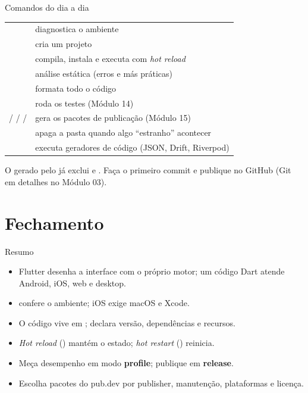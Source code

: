 \documentclass[aspectratio=169,10pt]{beamer}
\begin{document}
\begin{frame}{Comandos do dia a dia}
  \footnotesize
  \begin{tabularx}{\textwidth}{@{}l L@{}}
    \toprule
     &  \\
    \midrule
     & diagnostica o ambiente \\
     & cria um projeto \\
     & compila, instala e executa com \emph{hot reload} \\
     & análise estática (erros e más práticas) \\
     & formata todo o código \\
     & roda os testes (Módulo 14) \\
     /  /  /  & gera os pacotes de publicação (Módulo 15) \\
     & apaga a pasta  quando algo ``estranho'' acontecer \\
     & executa geradores de código (JSON, Drift, Riverpod) \\
    \bottomrule
  \end{tabularx}
  \begin{dica}[Git]
    O  gerado pelo  já exclui  e . Faça o primeiro commit e publique no GitHub (Git em detalhes no Módulo 03).
  \end{dica}
\end{frame}

\section{Fechamento}

\begin{frame}{Resumo}
  \begin{resumo}
    \begin{itemize}
      \item Flutter desenha a interface com o próprio motor; um código Dart atende Android, iOS, web e desktop.
      \item {} confere o ambiente; iOS exige macOS e Xcode.
      \item O código vive em ;  declara versão, dependências e recursos.
      \item \emph{Hot reload} () mantém o estado; \emph{hot restart} () reinicia.
      \item Meça desempenho em modo \textbf{profile}; publique em \textbf{release}.
      \item Escolha pacotes do pub.dev por publisher, manutenção, plataformas e licença.
    \end{itemize}
  \end{resumo}
\end{frame}
\end{document}
